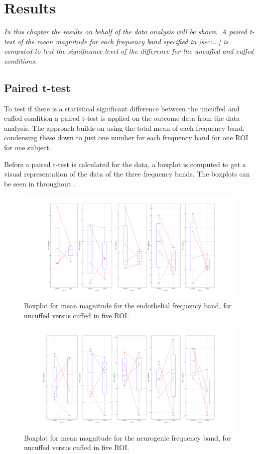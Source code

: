 \chapter{Results}
\textit{In this chapter the results on behalf of the data analysis will be shown. A paired t-test of the mean magnitude for each frequency band specified in \ref{sec:...} is computed to test the significance level of the difference for the uncuffed and cuffed conditions.}

\section{Paired t-test}
To test if there is a statistical significant difference between the uncuffed and cuffed condition a paired t-test is applied on the outcome data from the data analysis. The approach builds on using the total mean of each frequency band, condensing these down to just one number for each frequency band for one ROI for one subject. 

Before a paired t-test is calculated for the data, a boxplot is computed to get a visual representation of the data of the three frequency bands. The boxplots can be seen in  throughout . 

\begin{figure}[H]
	\includegraphics[width=1\textwidth]{figures/boxplot_endo}
	\caption{Boxplot for mean magnitude for the endothelial frequency band, for uncuffed versus cuffed in five ROI.}
	\label{fig:boxEndo}
\end{figure}

\begin{figure}[H]
	\includegraphics[width=1\textwidth]{figures/boxplot_neuro}
	\caption{Boxplot for mean magnitude for the neurogenic frequency band, for uncuffed versus cuffed in five ROI.}
	\label{fig:boxNeuro}
\end{figure}

